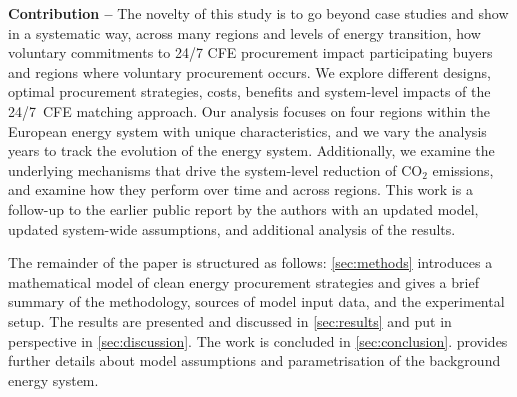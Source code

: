 
\textbf{Contribution --} The novelty of this study is to go beyond case studies and show in a systematic way, across many regions and levels of energy transition, how voluntary commitments to 24/7 CFE procurement impact participating buyers and regions where voluntary procurement occurs.
We explore different designs, optimal procurement strategies, costs, benefits and system-level impacts of the 24/7~CFE matching approach.
Our analysis focuses on four regions within the European energy system with unique characteristics, and we vary the analysis years to track the evolution of the energy system.
Additionally, we examine the underlying mechanisms that drive the system-level reduction of CO$_2$ emissions, and examine how they perform over time and across regions. 
This work is a follow-up to the earlier public report by the authors \cite{riepin-zenodo-systemlevel247} with an updated model, updated system-wide assumptions, and additional analysis of the results. 


The remainder of the paper is structured as follows: \cref{sec:methods} introduces a mathematical model of clean energy procurement strategies and gives a brief summary of the methodology, sources of model input data, and the experimental setup.
The results are presented and discussed in \cref{sec:results} and put in perspective in \cref{sec:discussion}. 
The work is concluded in \cref{sec:conclusion}. 
 provides further details about model assumptions and parametrisation of the background energy system.
